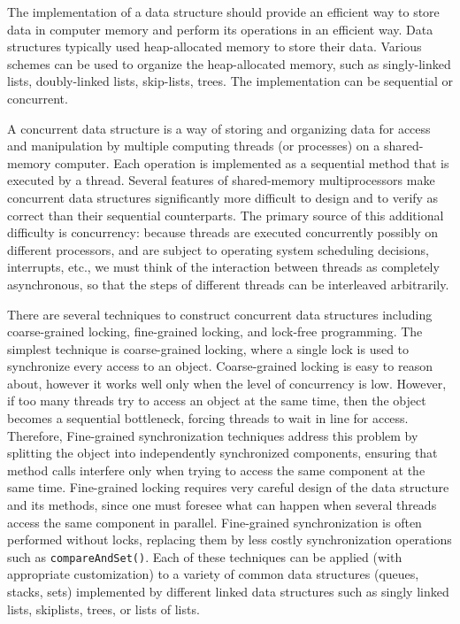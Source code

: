 The implementation of a data structure should provide
an efficient way to store data in computer memory and perform its operations
in an efficient way. Data structures
typically used heap-allocated memory to store their data. Various schemes
can be used to organize the heap-allocated memory, such as singly-linked lists,
doubly-linked lists, skip-lists, trees. The implementation
can be sequential or concurrent.

A concurrent data structure is a way of storing and organizing data for access and manipulation by multiple computing threads (or processes) on a shared-memory computer. Each operation is implemented as a sequential
method that is executed by a thread. Several features of shared-memory multiprocessors make concurrent data structures significantly more difficult to design and to verify as correct than their sequential counterparts. The primary source of this additional difficulty is concurrency: because threads are executed concurrently possibly on different processors, and are subject to operating system scheduling decisions, interrupts, etc., we must think of the interaction between threads as completely asynchronous, so that the steps of different threads can be interleaved arbitrarily. %



There are several techniques to construct concurrent data structures including coarse-grained locking, fine-grained locking, and lock-free programming. The simplest technique is coarse-grained locking, where a single lock is used to synchronize every access to an object. Coarse-grained locking is easy to reason about, however it works well only when the level of concurrency is low. However, if too many threads try to access an object at the same time, then the object becomes a sequential bottleneck, forcing threads to wait in line for access. Therefore, Fine-grained synchronization techniques address this problem by splitting the object into independently synchronized components, ensuring that method calls interfere only when trying to access the same component at the same time. Fine-grained locking requires very careful design of the data structure and its
methods, since one must foresee what can happen when several threads access
the same component in parallel.
Fine-grained synchronization is often performed without locks, replacing them by less costly
synchronization operations such as {\tt compareAndSet()}. Each of these techniques can be applied (with appropriate customization) to a variety of common data structures (queues, stacks, sets) implemented by different linked data structures such as singly linked lists, skiplists, trees, or lists of lists. 

